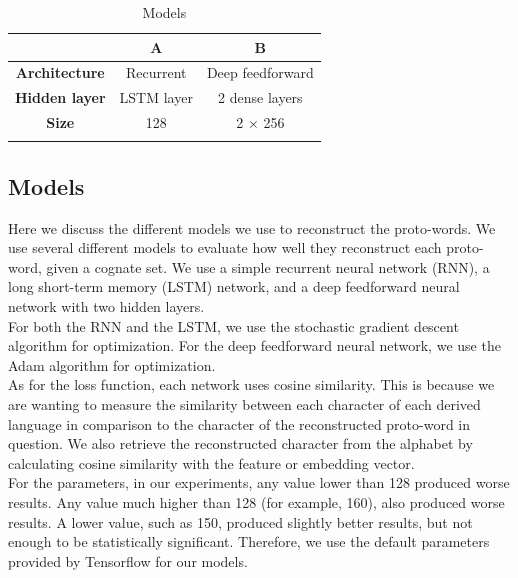 \begin{table}
\centering
\begin{tabular}{ccc}
    \hline
    & \textbf{A} & \textbf{B} \\
    \hline
    \textbf{Architecture} & Recurrent & Deep feedforward \\
    \textbf{Hidden layer} & LSTM layer & 2 dense layers \\
    \textbf{Size} & 128 & 2 $\times$ 256 \\
    \hline
    & 
\end{tabular}
\caption{Models}
\label{tab:my_label}
\end{table}

\subsection{Models}
Here we discuss the different models we use to reconstruct the proto-words.
We use several different models to evaluate how well they reconstruct each proto-word, given a cognate set. We use a simple recurrent neural network (RNN), a long short-term memory (LSTM) network, and a deep feedforward neural network with two hidden layers.\\
For both the RNN and the LSTM, we use the stochastic gradient descent algorithm for optimization. For the deep feedforward neural network, we use the Adam algorithm for optimization.\\
As for the loss function, each network uses cosine similarity. This is because we are wanting to measure the similarity between each character of each derived language in comparison to the character of the reconstructed proto-word in question. We also retrieve the reconstructed character from the alphabet by calculating cosine similarity with the feature or embedding vector. \\
For the parameters, in our experiments, any value lower than 128 produced worse results. Any value much higher than 128 (for example, 160), also produced worse results. A lower value, such as 150, produced slightly better results, but not enough to be statistically significant. Therefore, we use the default parameters provided by Tensorflow for our models.

